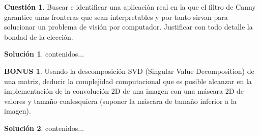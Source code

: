 \documentclass[a4paper, 11pt]{article}
\theoremstyle{definition}
\newtheorem{cuestion}{Cuestión}
\newtheorem*{solucion}{Solución}
\newtheorem*{bonus}{BONUS}
\begin{document}
  \begin{cuestion}
     	Buscar e identificar una aplicación real en la que el filtro de
      Canny garantice unas fronteras que sean interpretables y por tanto sirvan
       para solucionar un problema de visión por computador.
        Justificar con todo detalle la bondad de la elección.

  \end{cuestion}

  \begin{solucion}
     	contenidos...
  \end{solucion}
  \begin{bonus}
     	Usando la descomposición SVD (Singular Value
      Decomposition) de una matriz, deducir la complejidad computacional que es
      posible alcanzar en la implementación de la convolución 2D de una imagen
      con una máscara 2D de valores y tamaño cualesquiera (suponer la máscara de
      tamaño inferior a la imagen).

  \end{bonus}

  \begin{solucion}
     	contenidos...
  \end{solucion}
\end{document}
